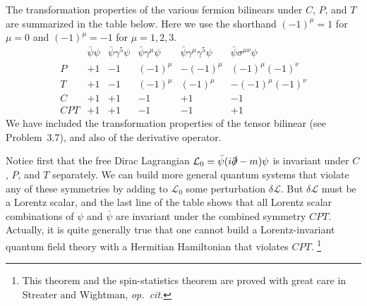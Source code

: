 The transformation properties of the various fermion bilinears under $C$,
$P$, and $T$ are summarized in the table below.  Here we use the shorthand
$(-1)^\mu = 1$ for $\mu = 0$ and $(-1)^\mu = -1$ for
$\mu = 1, 2, 3$.
\begin{equation}
  \begin{array}{c|ccccc}
    & \bar{\psi}\psi & \bar{\psi}\gamma^5\psi
      & \bar{\psi}\gamma^\mu\psi & \bar{\psi}\gamma^\mu\gamma^5\psi
      & \bar{\psi}\sigma^{\mu\nu}\psi\\
    \hline
    P & +1 & -1 & (-1)^\mu & -(-1)^\mu & (-1)^\mu(-1)^\nu\\
    T & +1 & -1 & (-1)^\mu & (-1)^\mu & -(-1)^\mu(-1)^\nu\\
    C & +1 & +1 & -1 & +1 & -1\\
    CPT & +1 & +1 & -1 & -1 & +1
  \end{array}
  \label{eq:3.142}
\end{equation}
We have included the transformation properties of the tensor bilinear (see
Problem~3.7), and also of the derivative operator.

Notice first that the free Dirac Lagrangian
$\mathcal{L}_0 = \bar{\psi}(i\slashed{\partial} - m)\psi$ is invariant under
$C$, $P$, and $T$ separately.  We can build more general quantum systems that
violate any of these symmetries by adding to $\mathcal{L}_0$ some
perturbation $\delta\mathcal{L}$.  But $\delta\mathcal{L}$ must be a Lorentz
scalar, and the last line of the table shows that all Lorentz scalar
combinations of $\psi$ and $\bar{\psi}$ are invariant under the combined
symmetry $CPT$.  Actually, it is quite generally true that one cannot build a
Lorentz-invariant quantum field theory with a Hermitian Hamiltonian that
violates $CPT$.%
\footnote{This theorem and the spin-statistics theorem are proved with great
care in Streater and Wightman, \emph{op.~cit.}}

\problems

